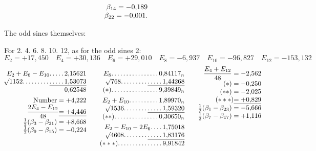 \begin{landscape}
\[\begin{array}{@{}r@{\qquad}r@{\qquad}r@{}}
\begin{array}[t]{@{}r@{}}
\beta_{14}=-0{,}189\\
\beta_{22}=-0{,}001.
\end{array}
\end{array}
\]
\par\noindent\hspace*{\parindent}The odd sines themselves:
\par\noindent\hspace*{\parindent}For 2. 4. 6. 8. 10. 12, as for the odd sines 2:
\[E_2=+17{,}450\quad E_4=+30{,}136\quad E_6=+29{,}010\quad E_8=-6{,}937\quad E_{10}=-96{,}827\quad E_{12}=-153{,}132\]
\[
\begin{array}{@{}r@{\qquad}r@{\qquad}r@{}}
\begin{array}[t]{@{}r@{}}
E_2+E_6-E_{10}\VfourDots{4}2{,}15621\\
\BareRoot{1152}\VfourDots{8}\underline{\VfourDots{4}1{,}53073}\\
0{,}62548\\[4pt]
\text{Number}=+4{,}222\\
\dfrac{2E_4-E_{12}}{48}\underline{=+4{,}446}\\
\tfrac12(\beta_3-\beta_{21})=+8{,}668\\
\tfrac12(\beta_9-\beta_{15})=-0{,}224
\end{array}
&\begin{array}[t]{@{}r@{}}
E_8\VfourDots{15}0{,}84117_n\\
\BareRoot{768}\VfourDots{8}\underline{\VfourDots{4}1{,}44268}\\
(*)\VfourDots{15}9{,}39849_n\\[4pt]
E_2+E_{10}\VfourDots{9}1{,}89970_n\\
\BareRoot{1536}\VfourDots{7}\underline{\VfourDots{4}1{,}59320}\\
(**)\VfourDots{14}0{,}30650_n\\[4pt]
E_2-E_{10}-2E_6\VfourDots{3}1{,}75018\\
\BareRoot{4608}\VfourDots{7}\underline{\VfourDots{4}1{,}83176}\\
(***)\VfourDots{14}9{,}91842
\end{array}
&\begin{array}[t]{@{}r@{}}
\dfrac{E_4+E_{12}}{48}=-2{,}562\\
(*)=-0{,}250\\
(**)=-2{,}025\\
(***)\underline{=+0{,}829}\\
\tfrac12(\beta_1-\beta_{23})=-5{,}666\\
\tfrac12(\beta_7-\beta_{17})=+1{,}116\\

\end{array}
\end{array}\]
\end{landscape}
